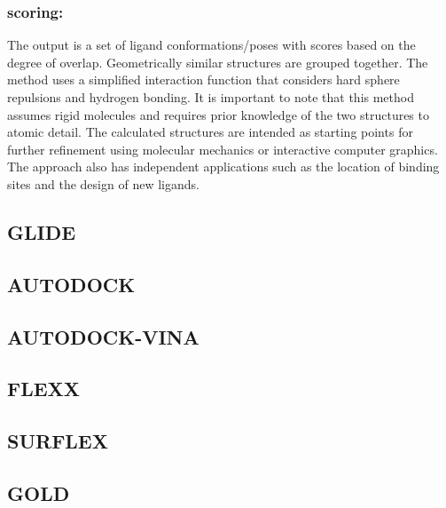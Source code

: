 \subsubsection*{scoring:}
The output is a set of ligand conformations/poses with scores based on the degree of overlap. Geometrically similar structures are grouped together. The method uses a simplified interaction function that considers hard sphere repulsions and hydrogen bonding. It is important to note that this method assumes rigid molecules and requires prior knowledge of the two structures to atomic detail. The calculated structures are intended as starting points for further refinement using molecular mechanics or interactive computer graphics. The approach also has independent applications such as the location of binding sites and the design of new ligands.

\subsection*{GLIDE}

\subsection*{AUTODOCK}

\subsection*{AUTODOCK-VINA}

\subsection*{FLEXX}

\subsection*{SURFLEX}


\subsection*{GOLD}

